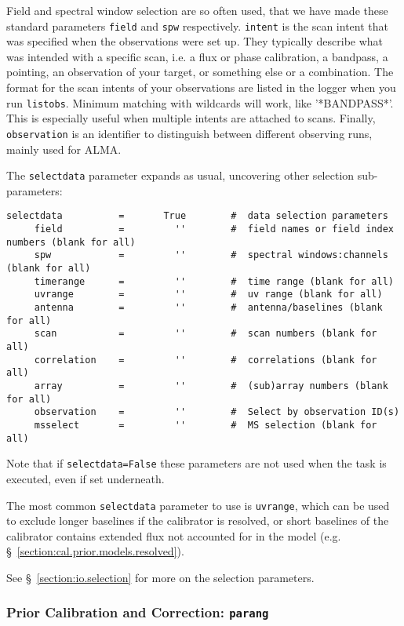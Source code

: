 Field and spectral window selection are so often used, that we have
made these standard parameters {\tt field} and {\tt spw}
respectively. {\tt intent} is the scan intent that was specified when
the observations were set up. They typically describe what was
intended with a specific scan, i.e. a flux or phase calibration, a
bandpass, a pointing, an observation of your target, or something else
or a combination. The format for the scan intents of your observations
are listed in the logger when you run {\tt listobs}. Minimum matching
with wildcards will work, like '*BANDPASS*'. This is especially useful
when multiple intents are attached to scans.  Finally, {\tt
  observation} is an identifier to distinguish between different
observing runs, mainly used for ALMA.

The {\tt selectdata} parameter expands as usual, uncovering other
selection sub-parameters:
\small
\begin{verbatim}
selectdata          =       True        #  data selection parameters
     field          =         ''        #  field names or field index numbers (blank for all)
     spw            =         ''        #  spectral windows:channels (blank for all)
     timerange      =         ''        #  time range (blank for all)
     uvrange        =         ''        #  uv range (blank for all)
     antenna        =         ''        #  antenna/baselines (blank for all)
     scan           =         ''        #  scan numbers (blank for all)
     correlation    =         ''        #  correlations (blank for all)
     array          =         ''        #  (sub)array numbers (blank for all)
     observation    =         ''        #  Select by observation ID(s)
     msselect       =         ''        #  MS selection (blank for all)
\end{verbatim}
\normalsize
Note that if {\tt selectdata=False} these parameters are not used when
the task is executed, even if set underneath.

The most common {\tt selectdata} parameter to use is {\tt uvrange},
which can be used to exclude longer baselines if the calibrator is
resolved, or short baselines of the calibrator contains extended flux
not accounted for in the model 
(e.g. \S~\ref{section:cal.prior.models.resolved}).

See \S~\ref{section:io.selection} for more on the selection parameters.

\subsubsection{Prior Calibration and Correction: {\tt parang} }
\label{section:cal.solve.pars.prior}

